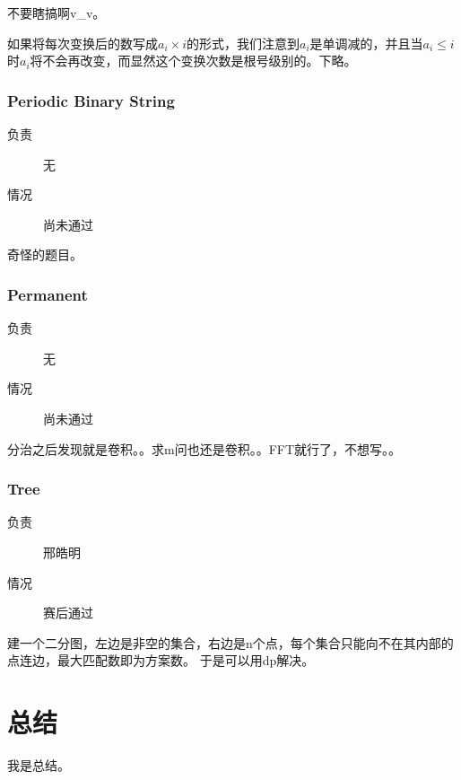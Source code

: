 \documentclass[a4paper, 11pt, nofonts, nocap, fancyhdr]{ctexart}
\newcommand{\problem}[1]{\subsubsection{#1}}
\begin{document}
不要瞎搞啊v\_v。

如果将每次变换后的数写成$a_i \times i$的形式，我们注意到$a_i$是单调减的，并且当$a_i \leq i$时$a_i$将不会再改变，而显然这个变换次数是根号级别的。下略。

\problem{Periodic Binary String}

\begin{description}
\item[负责] 无
\item[情况] 尚未通过
\end{description}

奇怪的题目。

\problem{Permanent}

\begin{description}
\item[负责] 无
\item[情况] 尚未通过
\end{description}

分治之后发现就是卷积。。求m问也还是卷积。。FFT就行了，不想写。。

\problem{Tree}

\begin{description}
\item[负责] 邢皓明
\item[情况] 赛后通过
\end{description}

建一个二分图，左边是非空的集合，右边是n个点，每个集合只能向不在其内部的点连边，最大匹配数即为方案数。
于是可以用dp解决。

\section{总结}

我是总结。
\end{document}
